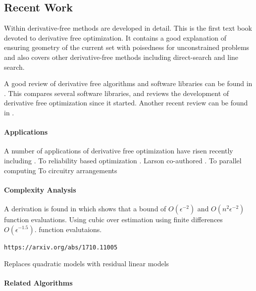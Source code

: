 \documentclass{article}
\begin{document}
\subsection{Recent Work}


Within  \cite{DUMMY:intro_book} derivative-free methods are developed in detail.
This is the first text book devoted to derivative free optimization.
It contains a good explanation of ensuring geometry of the current set with poisedness for unconstrained problems and also covers other derivative-free methods including direct-search and line search.

A good review of derivative free algorithms and software libraries can be found in \cite{DUMMY:review}.
This compares several software libraries, and reviews the development of derivative free optimization since it started.
Another recent review can be found in \cite{DUMMY:review2}.





\paragraph{Applications}
A number of applications of derivative free optimization have risen recently including .
To reliability based optimization \cite{Gao2017}.
Larson co-authored \cite{1742-6596-874-1-012062}.
To parallel computing \cite{Cheng2017}
To circuitry arrangements \cite{PLOSKAS201816}
\cite{KS2018}


\paragraph{Complexity Analysis}

A derivation is found in \cite{doi:10.1137/151005683} which shows that a bound of $O(\epsilon^{-2})$ and $O(n^2\epsilon^{-2})$ function evaluations.
Using cubic over estimation using finite differences $O(\epsilon^{-1.5})$.
 function evalutaions.

 
\cite{doi:10.1093/imanum/drx043}


\begin{verbatim}
https://arxiv.org/abs/1710.11005
\end{verbatim}
Replaces quadratic models with residual linear models


\paragraph{Related Algorithms}
\end{document}
